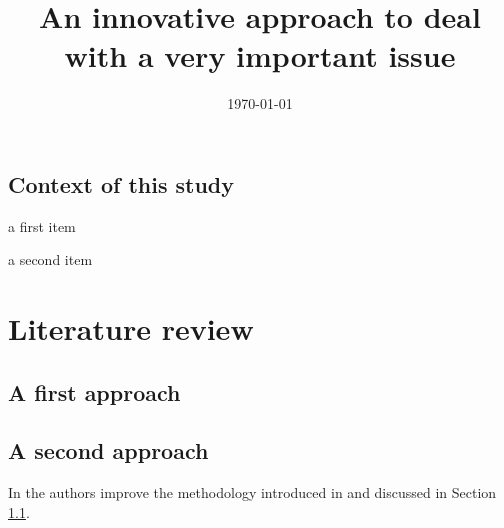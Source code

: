 \documentclass{gsemthesis}
\title{An innovative approach to deal with a very important issue}
\date{\today}
\begin{document}
\printcoverpage

\printfrontmatter


\startintroduction 

\lipsum[1]

\section*{Context of this study}
\label{sec:context}

\lipsum[2]
\begin{itemize*}
\item a first item
\item a second item
\end{itemize*}
\lipsum[3-29]



\chapter{Literature review}
\label{ch:lt}

\lipsum[30]

\section{A first approach}
\label{sec:first}

\lipsum[31-50]

\section{A second approach}

\lipsum[51-70]

In \textcite{keyref2} the authors improve the methodology introduced in \autocite{keyref1} and discussed in Section \ref{sec:first}.




\startconclusion

\lipsum[100-111]






\end{document}
